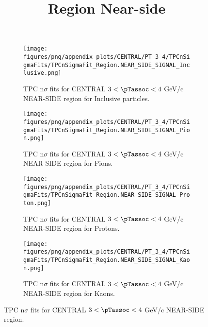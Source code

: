             \begin{figure}[H]
                \title{Region Near-side}
                \begin{subfigure}[b]{0.5\textwidth}
                    \centering
                    \texttt{[image: figures/png/appendix\_plots/CENTRAL/PT\_3\_4/TPCnSigmaFits/TPCnSigmaFit\_Region.NEAR\_SIDE\_SIGNAL\_Inclusive.png]}
                    \caption{TPC n$\sigma$ fits for CENTRAL $3 < \pTassoc < 4$ GeV/c NEAR-SIDE region for Inclusive particles.}
                    \label{fig:appendix_CENTRAL_$3 < \pTassoc < 4$ GeV/c_NEAR_SIDE_SIGNAL_Inclusive}
                \end{subfigure}
                \begin{subfigure}[b]{0.5\textwidth}
                    \centering
                    \texttt{[image: figures/png/appendix\_plots/CENTRAL/PT\_3\_4/TPCnSigmaFits/TPCnSigmaFit\_Region.NEAR\_SIDE\_SIGNAL\_Pion.png]}
                    \caption{TPC n$\sigma$ fits for CENTRAL $3 < \pTassoc < 4$ GeV/c NEAR-SIDE region for Pions.}
                    \label{fig:appendix_CENTRAL_$3 < \pTassoc < 4$ GeV/c_NEAR_SIDE_SIGNAL_Pion}
                \end{subfigure}
                \begin{subfigure}[b]{0.5\textwidth}
                    \centering
                    \texttt{[image: figures/png/appendix\_plots/CENTRAL/PT\_3\_4/TPCnSigmaFits/TPCnSigmaFit\_Region.NEAR\_SIDE\_SIGNAL\_Proton.png]}
                    \caption{TPC n$\sigma$ fits for CENTRAL $3 < \pTassoc < 4$ GeV/c NEAR-SIDE region for Protons.}
                    \label{fig:appendix_CENTRAL_$3 < \pTassoc < 4$ GeV/c_NEAR_SIDE_SIGNAL_Proton}
                \end{subfigure}
                \begin{subfigure}[b]{0.5\textwidth}
                    \centering
                    \texttt{[image: figures/png/appendix\_plots/CENTRAL/PT\_3\_4/TPCnSigmaFits/TPCnSigmaFit\_Region.NEAR\_SIDE\_SIGNAL\_Kaon.png]}
                    \caption{TPC n$\sigma$ fits for CENTRAL $3 < \pTassoc < 4$ GeV/c NEAR-SIDE region for Kaons.}
                    \label{fig:appendix_CENTRAL_$3 < \pTassoc < 4$ GeV/c_NEAR_SIDE_SIGNAL_Kaon}
                \end{subfigure}
                \caption{TPC n$\sigma$ fits for CENTRAL $3 < \pTassoc < 4$ GeV/c NEAR-SIDE region.}
                \label{fig:appendix_CENTRAL_$3 < \pTassoc < 4$ GeV/c_NEAR_SIDE_SIGNAL}
            \end{figure}
